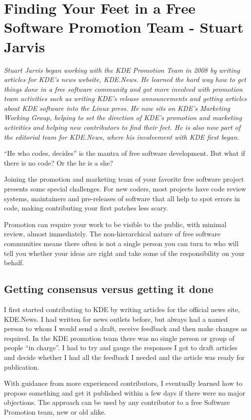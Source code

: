 \chapter{Finding Your Feet in a Free Software Promotion Team - Stuart Jarvis}
\textit{Stuart Jarvis began working with the KDE Promotion Team in 2008 by
writing articles for KDE's news website, KDE.News. He learned the hard way how
to get things done in a free software community and got more involved with
promotion team activities such as writing KDE's release announcements and
getting articles about KDE software into the Linux press. He now sits on KDE's
Marketing Working Group, helping to set the direction of KDE's promotion and
marketing activities and helping new contributors to find their feet. He is also
now part of the editorial team for KDE.News, where his involvement with KDE
first began.}

``He who codes, decides'' is the mantra of free software development. But what
if there is no code? Or the he is a she?

Joining the promotion and marketing team of your favorite free software project
presents some special challenges. For new coders, most projects have code review
systems, maintainers and pre-releases of software that all help to spot errors
in code, making contributing your first patches less scary. 

Promotion can require your work to be visible to the public, with minimal
review, almost immediately. The non-hierarchical nature of free software
communities means there often is not a single person you can turn to who will
tell you whether your ideas are right and take some of the responsibility on
your behalf.

\section*{Getting consensus versus getting it done}

I first started contributing to KDE by writing articles for the official news
site, KDE.News. I had written for news outlets before, but always had a named
person to whom I would send a draft, receive feedback and then make changes as
required. In the KDE promotion team there was no single person or group of
people ``in charge''. I had to try and gauge the responses I got to draft
articles and decide whether I had all the feedback I needed and the article was
ready for publication.

With guidance from more experienced contributors, I eventually learned how to
propose something and get it published within a few days if there were no major
objections. The approach can be used by any contributor to a free Software
Promotion team, new or old alike.

